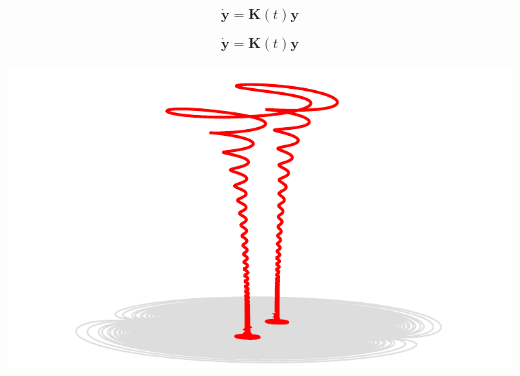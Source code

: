\begin{equation*}
  \dot{\mathbf{y}} = \mathbf{K}(t) \mathbf{y}
\end{equation*}

\begin{equation*}
  \dot{\mathbf{y}} = \mathbf{K}(t) \mathbf{y}
\end{equation*}

\eframe

\begin{center}
  \includegraphics[width=\textwidth]{i/far.pdf}
\end{center}
\eframe

